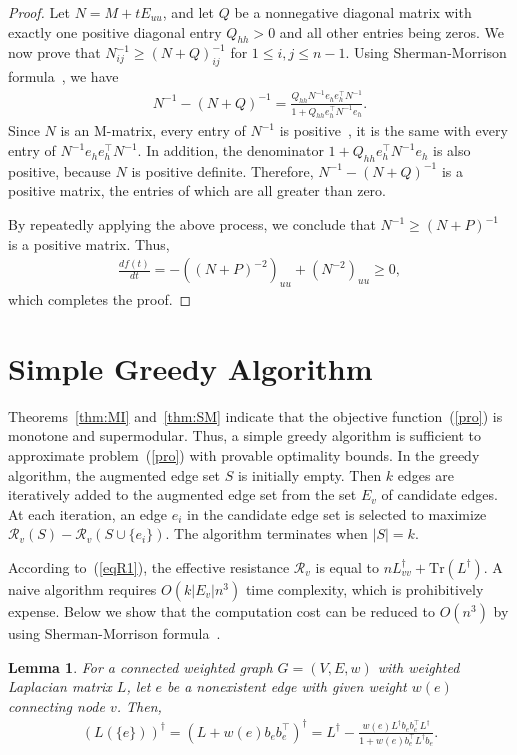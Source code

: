 \documentclass{article}
\def\kh#1{\left( #1 \right)}
\newcommand\bb{\boldsymbol{\mathit{b}}}
\newcommand\ee{\boldsymbol{\mathit{e}}}
\newcommand\LL{\bm{\mathit{L}}}
\newcommand\EE{\boldsymbol{\mathit{E}}}
\newcommand\PP{\boldsymbol{\mathit{P}}}
\newcommand\MM{\boldsymbol{\mathit{M}}}
\newcommand\QQ{\boldsymbol{\mathit{Q}}}
\newcommand\NN{\boldsymbol{\mathit{N}}}
\newtheorem{lemma}[theo]{Lemma}
\begin{document}
\begin{proof}
Let $\NN = \MM + t \EE_{uu}$,  and let $\QQ$ be a nonnegative diagonal matrix with exactly one positive diagonal entry $\QQ_{hh} > 0$ and all other entries being zeros. We now prove that $\NN^{-1}_{ij} \geq \kh{\NN+\QQ}^{-1}_{ij}$ for $1 \leq i,j \leq n-1$.  Using Sherman-Morrison formula~\cite{Me73}, we have
\begin{align*}
\NN^{-1} - \kh{\NN+\QQ}^{-1} = \frac{\QQ_{hh} \NN^{-1} \ee_h\ee_h^\top \NN^{-1}}{1+ \QQ_{hh} \ee_h^\top \NN^{-1} \ee_h}.
\end{align*}
Since $\NN$ is an M-matrix, every entry of $\NN^{-1}$ is positive~\cite{plemmons1977m}, it is the same with  every entry of $\NN^{-1} \ee_h\ee_h^\top \NN^{-1}$.  In addition,   the denominator $1+ \QQ_{hh} \ee_h^\top \NN^{-1} \ee_h$ is also positive, because $\NN$ is positive definite. Therefore, $\NN^{-1} - \kh{\NN+\QQ}^{-1}$ is a positive matrix,  the entries of which are all greater than zero.

By repeatedly applying the above process, we conclude  that $\NN^{-1} \geq \kh{\NN+\PP}^{-1}$  is a positive matrix. Thus,
\begin{align*}
\frac{df(t)}{dt} = - \kh{\kh{\NN+\PP}^{-2}}_{uu} + \kh{\NN^{-2}}_{uu} \geq 0,
\end{align*}
which completes the proof.
\end{proof}


\section{Simple Greedy Algorithm}

Theorems~\ref{thm:MI} and~\ref{thm:SM} indicate that  the objective function~(\ref{pro}) is monotone and supermodular. Thus, a simple greedy algorithm is sufficient to approximate  problem~(\ref{pro}) with provable optimality bounds. In the greedy algorithm, the augmented edge set $S$ is initially empty. Then $k$ edges are iteratively added to the augmented edge set from the set $E_v$ of candidate edges. At each iteration, an edge $e_i$ in the candidate edge set is selected to maximize $\mathcal{R}_v(S) - \mathcal{R}_v(S \cup \{e_i\})$. The algorithm terminates when $|S| = k$. \par
According to~(\ref{eqR1}), the effective resistance $\mathcal{R}_v$ is equal to $n\LL_{vv}^\dag+\mathrm{Tr}(\LL^\dag)$. A naive algorithm requires $O(k |E_v|n^3)$ time complexity, which is prohibitively expense. Below we show that the computation cost can be reduced to $O(n^3)$ by using Sherman-Morrison formula~\cite{Me73}.
\begin{lemma} \label{lem:SMF}
For a connected weighted graph $G=(V,E,w)$ with weighted Laplacian matrix $\LL$, let $e$ be a nonexistent  edge with given weight $w(e)$ connecting  node   $v$. Then,
\small
\begin{align*}
\kh{\LL(\{e\})}^\dag = \kh{\LL + w(e)\bb_e\bb_e^\top}^\dag
= \LL^\dag - \frac{w(e) \LL^\dag \bb_e \bb_e^\top \LL^\dag}{1 + w(e)\bb_e^\top \LL^\dag \bb_e}.
\end{align*}
\normalsize
\end{lemma}
\end{document}
